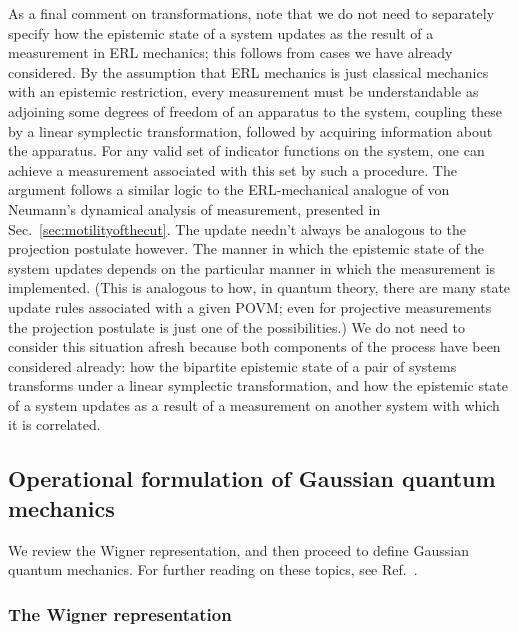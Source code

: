 \documentclass[pra,superscriptaddress,nofootinbib,12pt]{revtex4-2}
\begin{document}
As a final comment on transformations, note that we do not need to separately specify how the epistemic state of a system updates as the result of a measurement in ERL mechanics; this follows from cases we have already considered.  By the assumption that ERL mechanics is just classical mechanics with an epistemic restriction, every measurement must be understandable as adjoining some degrees of freedom of an apparatus to the system, coupling these by a linear symplectic transformation, followed by acquiring information about the apparatus. For any valid set of indicator functions on the system, one can achieve a measurement associated with this set by such a procedure.  The argument follows a similar logic to the ERL-mechanical analogue of von Neumann's dynamical analysis of measurement, presented in Sec.~\ref{sec:motilityofthecut}.  The update needn't always be analogous to the projection postulate however.  The manner in which the epistemic state of the system updates depends on the particular manner in which the measurement is implemented. (This is analogous to how, in quantum theory, there are many state update rules associated with a given POVM; even for projective measurements the projection postulate is just one of the possibilities.)  We do not need to consider this situation afresh because both components of the process have been considered already: how the bipartite epistemic state of a pair of systems transforms under a linear symplectic transformation, and how the epistemic state of a system updates as a result of a measurement on another system with which it is correlated.


\subsection{Operational formulation of Gaussian quantum mechanics}
\label{sec:GaussianQM}


We review the Wigner representation, and then proceed to define Gaussian quantum mechanics.  For further reading on these topics, see Ref.~\cite{GardinerZoller,Wee11}.


\subsubsection{The Wigner representation}
\label{sec:Wigner}
\end{document}

